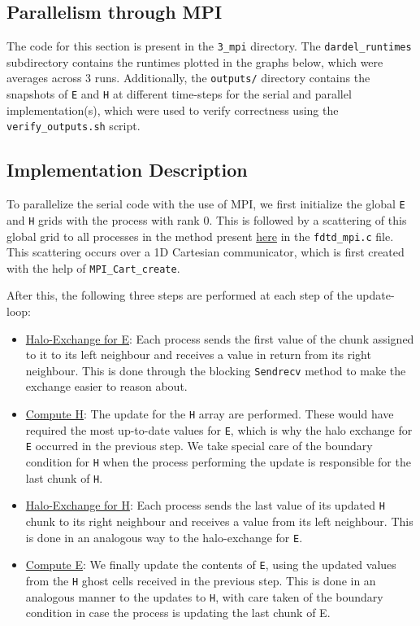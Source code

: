 \documentclass[a4paper,10pt]{article}
\begin{document}
\begin{multicols}{2}
\section{Parallelism through MPI}
\label{sec:3_mpi}
The code for this section is present in the \verb|3_mpi| directory. The \verb|dardel_runtimes| subdirectory contains the runtimes plotted in the graphs below, which were averages across 3 runs. Additionally, the \verb|outputs/| directory contains the snapshots of \verb|E| and \verb|H| at different time-steps for the serial and parallel implementation(s), which were used to verify correctness using the \verb|verify_outputs.sh| script.

\subsection{Implementation Description}
To parallelize the serial code with the use of MPI, we first initialize the global \verb|E| and \verb|H| grids with the process with rank 0. This is followed by a scattering of this global grid to all processes in the method present \href{https://github.com/paulmyr/DD2356-MethodsHPC/blob/master/5_project/3_mpi/fdtd_mpi.c#L25}{here} in the \verb|fdtd_mpi.c| file. This scattering occurs over a 1D Cartesian communicator, which is first created with the help of \verb|MPI_Cart_create|. 

After this, the following three steps are performed at each step of the update-loop:
\begin{itemize}
\item \underline{Halo-Exchange for E}: Each process sends the first value of the chunk assigned to it to its left neighbour and receives a value in return from its right neighbour. This is done through the blocking \verb|Sendrecv| method to make the exchange easier to reason about. 
\item \underline{Compute H}: The update for the \verb|H| array are performed. These would have required the most up-to-date values for \verb|E|, which is why the halo exchange for \verb|E| occurred in the previous step. We take special care of the boundary condition for \verb|H| when the process performing the update is responsible for the last chunk of \verb|H|.
\item \underline{Halo-Exchange for H}: Each process sends the last value of its updated \verb|H| chunk to its right neighbour and receives a value from its left neighbour. This is done in an analogous way to the halo-exchange for \verb|E|. 
\item \underline{Compute E}: We finally update the contents of \verb|E|, using the updated values from the \verb|H| ghost cells received in the previous step. This is done in an analogous manner to the updates to \verb|H|, with care taken of the boundary condition in case the process is updating the last chunk of E. 
\end{itemize}


\end{multicols}
\end{document}

